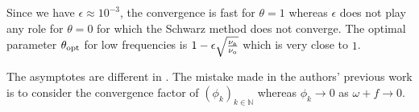 Since we have $\epsilon \approx 10^{-3}$, 
the convergence is fast for $\theta = 1$ whereas $\epsilon$
does not play any role for $\theta = 0$
for which the Schwarz method does not converge.
%
The optimal parameter $\theta_{\rm opt}$ for low frequencies is $1 - \epsilon\sqrt{\frac{\nu_{\rm a}}{\nu_{\rm o}}}$ which is very close to $1$.
\begin{remark}
	The asymptotes are different in \citep{clement_discrete_2021}.
	The mistake made in the authors' previous work
	is to consider the convergence factor of
	$(\phi_k)_{k\in \mathbb{N}}$
	whereas $\phi_k\to 0$ as $\omega+f\rightarrow 0$.
\end{remark}
